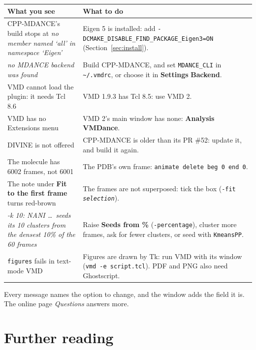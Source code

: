 \documentclass[11pt,letterpaper]{article}
\newcommand{\ui}[1]{\textsf{\textbf{#1}}}
\newcommand{\then}{\,\raisebox{0.15ex}{\scalebox{0.6}{$\blacktriangleright$}}\,}
\newcommand{\cmd}[1]{\texttt{#1}}
\newcommand{\meta}[1]{\textrm{\emph{#1}}}
\begin{document}
\begin{center}
\small
\begin{tabularx}{\textwidth}{@{}p{}L@{}}
\toprule
\textbf{What you see} & \textbf{What to do} \\
\midrule
CPP-MDANCE's build stops at \emph{no member named `all' in namespace `Eigen'}
  & Eigen 5 is installed: add \cmd{-DCMAKE\_DISABLE\_FIND\_PACKAGE\_Eigen3=ON}
  (Section~\ref{sec:install}). \\
\addlinespace
\emph{no MDANCE backend was found} & Build CPP-MDANCE, and set
  \cmd{MDANCE\_CLI} in \cmd{\textasciitilde/.vmdrc}, or choose it in
  \ui{Settings}\then\ui{Backend}. \\
\addlinespace
VMD cannot load the plugin: it needs Tcl 8.6 & VMD 1.9.3 has Tcl 8.5: use VMD 2. \\
\addlinespace
VMD has no Extensions menu & VMD 2's main window has none: \ui{Analysis}\then\ui{VMDance}. \\
\addlinespace
DIVINE is not offered & CPP-MDANCE is older than its PR \#52: update it, and build it again. \\
\addlinespace
The molecule has 6002 frames, not 6001 & The PDB's own frame:
  \cmd{animate delete beg 0 end 0}. \\
\addlinespace
The note under \ui{Fit to the first frame} turns red-brown & The frames are not
  superposed: tick the box (\cmd{-fit \meta{selection}}). \\
\addlinespace
\emph{-k 10: NANI \ldots\ seeds its 10 clusters from the densest 10\% of the 60 frames}
  & Raise \ui{Seeds from \%} (\cmd{-percentage}), cluster more frames, ask for
  fewer clusters, or seed with \cmd{KmeansPP}. \\
\addlinespace
\cmd{figures} fails in text-mode VMD & Figures are drawn by Tk: run VMD with
  its window (\cmd{vmd -e script.tcl}). PDF and PNG also need Ghostscript. \\
\bottomrule
\end{tabularx}
\end{center}

Every message names the option to change, and the window adds the field it
is. The online page \emph{Questions} answers more.

\section{Further reading}
\end{document}
